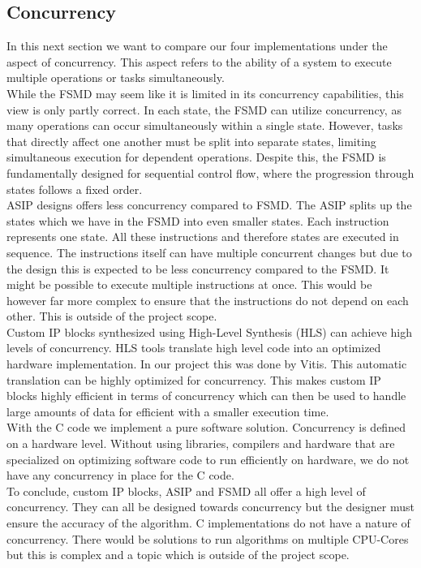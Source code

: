 \documentclass[conference]{IEEEtran}
\begin{document}
\subsection{Concurrency}
In this next section we want to compare our four implementations under the aspect of concurrency. This aspect refers to the ability of a system to execute multiple operations or tasks simultaneously.\\
While the FSMD may seem like it is limited in its concurrency capabilities, this view is only partly correct. In each state, the FSMD can utilize concurrency, as many operations can occur simultaneously within a single state. However, tasks that directly affect one another must be split into separate states, limiting simultaneous execution for dependent operations. Despite this, the FSMD is fundamentally designed for sequential control flow, where the progression through states follows a fixed order.\\
ASIP designs offers less concurrency compared to FSMD. The ASIP splits up the states which we have in the FSMD into even smaller states. Each instruction represents one state. All these instructions and therefore states are executed in sequence. The instructions itself can have multiple concurrent changes but due to the design this is expected to be less concurrency compared to the FSMD. It might be possible to execute multiple instructions at once. This would be however far more complex to ensure that the instructions do not depend on each other. This is outside of the project scope. \\
Custom IP blocks synthesized using High-Level Synthesis (HLS) can achieve high levels of concurrency. HLS tools translate high level code into an optimized hardware implementation. In our project this was done by Vitis. This automatic translation can be highly optimized for concurrency. This makes custom IP blocks highly efficient in terms of concurrency which can then be used to handle large amounts of data for efficient with a smaller execution time.\\
With the C code we implement a pure software solution. Concurrency is defined on a hardware level. Without using libraries, compilers and hardware that are specialized on optimizing software code to run efficiently on hardware, we do not have any concurrency in place for the C code.\\
To conclude, custom IP blocks, ASIP and FSMD all offer a high level of concurrency. They can all be designed towards concurrency but the designer must ensure the accuracy of the algorithm. C implementations do not have a nature of concurrency. There would be solutions to run algorithms on multiple CPU-Cores but this is complex and a topic which is outside of the project scope.\\
\end{document}
